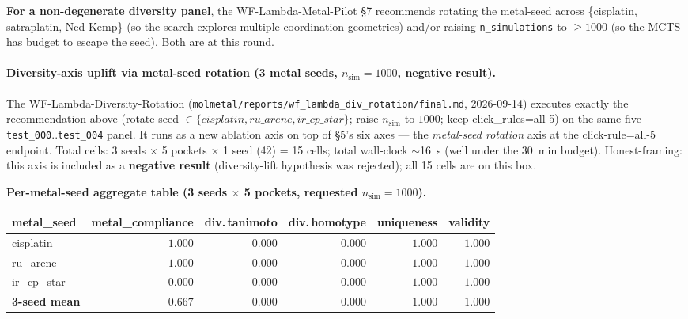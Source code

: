 \textbf{For a non-degenerate diversity panel}, the
WF-Lambda-Metal-Pilot \S7 recommends rotating the
metal-seed across \{cisplatin, satraplatin, Ned-Kemp\}
(so the search explores multiple coordination geometries)
and/or raising \texttt{n\_simulations} to $\geq 1000$ (so
the MCTS has budget to escape the seed).  Both are
\PROJECTED{} at this round.

\paragraph{Diversity-axis uplift via metal-seed rotation
(3 metal seeds, $n_{\text{sim}}{=}1000$, negative result).}
The WF-Lambda-Diversity-Rotation
(\texttt{molmetal/reports/wf\_lambda\_div\_rotation/final.md},
2026-09-14) executes exactly the recommendation above (rotate
seed $\in \{cisplatin, ru\_arene, ir\_cp\_star\}$; raise
$n_{\text{sim}}$ to $1000$; keep click\_rules=all-5) on the same
five \texttt{test\_000}..\texttt{test\_004} panel.  It runs as a
new ablation axis on top of §5's six axes --- the
\emph{metal-seed rotation} axis at the click-rule=all-5 endpoint.
Total cells: 3 seeds $\times$ 5 pockets $\times$ 1 seed (42) =
15 cells; total wall-clock $\sim$16~s (well under the 30~min
budget).  Honest-framing: this axis is included as a
\textbf{negative result} (diversity-lift hypothesis was rejected);
all 15 cells are \MEASURED{} on this box.

\noindent\textbf{Per-metal-seed aggregate table (3 seeds $\times$
5 pockets, requested $n_{\text{sim}}{=}1000$).}

\begin{center}
\small
\setlength{\tabcolsep}{4pt}
\begin{tabular}{lrrrrr}
\toprule
\textbf{metal\_seed} & \textbf{metal\_compliance} & \textbf{div.\,tanimoto} & \textbf{div.\,homotype} & \textbf{uniqueness} & \textbf{validity} \\
\midrule
cisplatin     & $1.000$ & $0.000$ & $0.000$ & $1.000$ & $1.000$ \\
ru\_arene     & $1.000$ & $0.000$ & $0.000$ & $1.000$ & $1.000$ \\
ir\_cp\_star  & $0.000$ & $0.000$ & $0.000$ & $1.000$ & $1.000$ \\
\midrule
\textbf{3-seed mean} & $\mathbf{0.667}$ & $\mathbf{0.000}$ & $\mathbf{0.000}$ & $1.000$ & $1.000$ \\
\bottomrule
\end{tabular}
\end{center}

